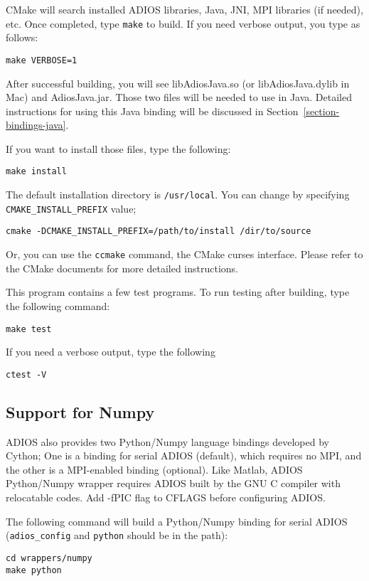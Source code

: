 CMake will search installed ADIOS libraries, Java, JNI, MPI libraries (if
needed), etc. Once completed, type \verb+make+ to build. If you need verbose output, you type as follows:
\begin{lstlisting}
make VERBOSE=1
\end{lstlisting}

After successful building, you will see libAdiosJava.so (or
libAdiosJava.dylib in Mac) and AdiosJava.jar. Those two files will be needed to use in Java. Detailed instructions for using this Java binding will be discussed in Section~\ref{section-bindings-java}.

If you want to install those files, type the following:
\begin{lstlisting}
make install
\end{lstlisting}

The default installation directory is \verb+/usr/local+. You can change by
specifying \verb+CMAKE_INSTALL_PREFIX+ value;
\begin{lstlisting}
cmake -DCMAKE_INSTALL_PREFIX=/path/to/install /dir/to/source
\end{lstlisting}

Or, you can use the \verb+ccmake+ command, the CMake curses interface. Please refer to the CMake documents for more detailed instructions.

This program contains a few test programs. To run testing after building,
type the following command:
\begin{lstlisting}
make test
\end{lstlisting}

If you need a verbose output, type the following
\begin{lstlisting}
ctest -V
\end{lstlisting}

\subsection{Support for Numpy}
\label{section-install-numpy}

ADIOS also provides two Python/Numpy language bindings developed by Cython; One is a binding for serial ADIOS (default), which requires no MPI, and the other is a MPI-enabled binding (optional). Like Matlab, ADIOS Python/Numpy wrapper requires ADIOS built by the GNU C compiler with relocatable codes. Add -fPIC flag to CFLAGS before configuring ADIOS.

The following command will build a Python/Numpy binding for serial ADIOS (\verb+adios_config+ and \verb+python+ should be in the path):
\begin{lstlisting}
cd wrappers/numpy
make python
\end{lstlisting}

